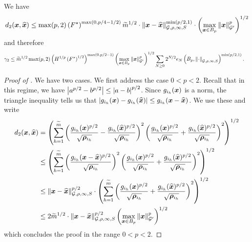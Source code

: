 \documentclass[11pt]{article}
\numberwithin{equation}{section}
\begin{document}
\begin{lemma}
\label{lemma:concentration_g2_rewrite_d}
We have
\begin{align*}
    d_2(\bm{x}, \widehat{\bm{x}}) \le \max(p,2) \left(F^{\star}\right)^{\max(0,p/4-1/2)}{\widetilde{m}}^{1/2} \cdot \left\lVert \bm{x}-\widehat{\bm{x}} \right\rVert_{\mathcal{G},\rho,\infty, S}^{\min(p/2,1)} \cdot \left(\max_{\bm{x} \in B_{p}}\left\lVert \bm{x} \right\rVert_{\mathcal{G}'}^p\right)^{1/2}
\end{align*}
and therefore
\begin{align*}
    \gamma_2 &\le {\widetilde{m}}^{1/2}\max(p,2) \left(H^{1/p}\left(F^{\star}\right)^{1/2}\right)^{\max(0,p/2-1)}\left(\max_{\bm{x} \in B_{p}}\left\lVert \bm{x} \right\rVert_{\mathcal{G}'}^p\right)^{1/2}\sum_{N \ge 0} 2^{N/2}e_N\left(B_p, \left\lVert \cdot \right\rVert_{\mathcal{G},\rho,\infty, S}\right)^{\min(p/2,1)}.
\end{align*}
\end{lemma}
\begin{proof}[Proof of ]
We have two cases. We first address the case $0 < p < 2$. Recall that in this regime, we have $\left\lvert a^{p/2}-b^{p/2} \right\rvert \le \left\lvert a-b \right\rvert^{p/2}$. Since $g_{i_h}(\bm{x})$ is a norm, the triangle inequality tells us that $\left\lvert g_{i_h}(\bm{x}) - g_{i_h}(\widehat{\bm{x}}) \right\rvert \le g_{i_h}(\bm{x}-\widehat{\bm{x}})$. We use these and write
\begin{align*}
    d_2(\bm{x}, \widehat{\bm{x}}) &= \left(\sum_{h=1}^{\widetilde{m}} \left(\frac{g_{i_h}(\bm{x})^{p/2}}{\sqrt{\bm{\rho}_{i_h}}} - \frac{g_{i_h}(\widehat{\bm{x}})^{p/2}}{\sqrt{\bm{\rho}_{i_h}}}\right)^2\left(\frac{g_{i_h}(\bm{x})^{p/2}}{\sqrt{\bm{\rho}_{i_h}}} + \frac{g_{i_h}(\widehat{\bm{x}})^{p/2}}{\sqrt{\bm{\rho}_{i_h}}}\right)^2\right)^{1/2} \\
    &\le \left(\sum_{h=1}^{\widetilde{m}} \left(\frac{g_{i_h}(\bm{x}-\widehat{\bm{x}})^{p/2}}{\sqrt{\bm{\rho}_{i_h}}}\right)^2\left(\frac{g_{i_h}(\bm{x})^{p/2}}{\sqrt{\bm{\rho}_{i_h}}} + \frac{g_{i_h}(\widehat{\bm{x}})^{p/2}}{\sqrt{\bm{\rho}_{i_h}}}\right)^2\right)^{1/2} \\
    &\le \left\lVert \bm{x}-\widehat{\bm{x}} \right\rVert_{\mathcal{G},\rho,\infty, S}^{p/2}\cdot\left(\sum_{h=1}^{\widetilde{m}} \left(\frac{g_{i_h}(\bm{x})^{p/2}}{\sqrt{\bm{\rho}_{i_h}}} + \frac{g_{i_h}(\widehat{\bm{x}})^{p/2}}{\sqrt{\bm{\rho}_{i_h}}}\right)^2\right)^{1/2} \\
    &\le 2{\widetilde{m}}^{1/2} \cdot \left\lVert \bm{x}-\widehat{\bm{x}} \right\rVert_{\mathcal{G},\rho,\infty, S}^{p/2}\left(\max_{\bm{x} \in B_{p}}\left\lVert \bm{x} \right\rVert_{\mathcal{G}'}^p\right)^{1/2}
\end{align*}
which concludes the proof in the range $0 < p < 2$.


\end{proof}
\end{document}
